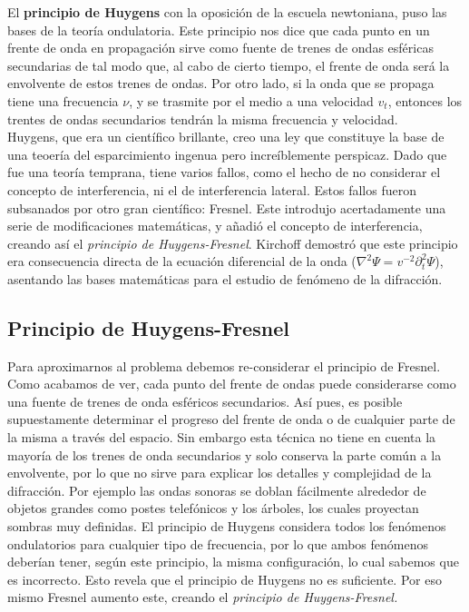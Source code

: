 \documentclass[12pt,a4paper]{book}
\numberwithin{equation}{section}
\numberwithin{figure}{section}
\newcommand{\1}{_{(1)}}
\newcommand{\2}{_{(2)}}
\theoremstyle{definition}
\begin{document}
 El \textbf{principio de Huygens} con la oposición de la escuela newtoniana, puso las bases de la teoría ondulatoria. Este principio nos dice que cada punto en un frente de onda en propagación sirve como fuente de trenes de ondas esféricas secundarias de tal modo que, al cabo de cierto tiempo, el frente de onda será la envolvente de estos trenes de ondas. Por otro lado, si la onda que se propaga tiene una frecuencia $\nu$, y se trasmite por el medio a una velocidad $v_t$, entonces los trentes de ondas secundarios tendrán la misma frecuencia y velocidad. \\

Huygens, que era un científico brillante, creo una ley que constituye la base de una teoería del esparcimiento ingenua pero increíblemente perspicaz. Dado que fue una teoría temprana, tiene varios fallos, como el hecho de no considerar el concepto de interferencia, ni el de interferencia lateral. Estos fallos fueron subsanados por otro gran científico: Fresnel. Este introdujo acertadamente una serie de modificaciones matemáticas, y añadió el concepto de interferencia, creando así el \textit{principio de Huygens-Fresnel}. Kirchoff demostró que este principio era consecuencia directa de la ecuación diferencial de la onda ($\nabla^2 \Psi = v^{-2} \partial_t^2 \Psi$), asentando las bases matemáticas para el estudio de fenómeno de la difracción. \\

\subsection{Principio de Huygens-Fresnel}

Para aproximarnos al problema debemos re-considerar el principio de Fresnel. Como acabamos de ver, cada punto del frente de ondas puede considerarse como una fuente de trenes de onda esféricos secundarios. Así pues, es posible supuestamente determinar el progreso del frente de onda o de cualquier parte de la misma a través del espacio. Sin embargo esta técnica no tiene en cuenta la mayoría de los trenes de onda secundarios y solo conserva la parte común a la envolvente, por lo que no sirve para explicar los detalles y complejidad de la difracción. Por ejemplo las ondas sonoras se doblan fácilmente alrededor de objetos grandes como postes telefónicos y los árboles, los cuales proyectan sombras muy definidas. El principio de Huygens considera todos los fenómenos ondulatorios para cualquier tipo de frecuencia, por lo que ambos fenómenos deberían tener, según este principio, la misma configuración, lo cual sabemos que es incorrecto. Esto revela que el principio de Huygens no es suficiente. Por eso mismo Fresnel aumento este, creando el \textit{principio de Huygens-Fresnel.} \\
\end{document}
